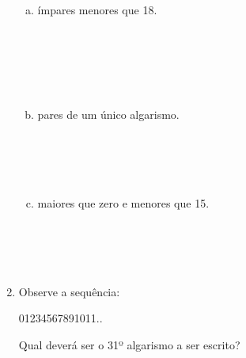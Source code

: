 \documentclass[a4paper,14pt]{article}
\begin{document}
\begin{multicols}{2}
\begin{enumerate}
\begin{enumerate}[a)]
				\item ímpares menores que 18. \\\\\\\\\\\\
				\item pares de um único algarismo. \\\\\\\\\\
				\item maiores que zero e menores que 15. \\\\\\\\\\
			\end{enumerate}
			\item Observe a sequência: \\
			\begin{center}
				01234567891011..
			\end{center}
			Qual deverá ser o 31º algarismo a ser escrito? \\\\\\\\\\
		\end{enumerate}
		$~$ \\ $~$ \\ $~$ \\ $~$ \\ $~$ \\ $~$ \\ $~$ \\ $~$ \\ $~$ \\ $~$ \\ $~$ \\ $~$ \\ $~$ \\ $~$ \\ $~$ \\
	\end{multicols}
\end{document}
